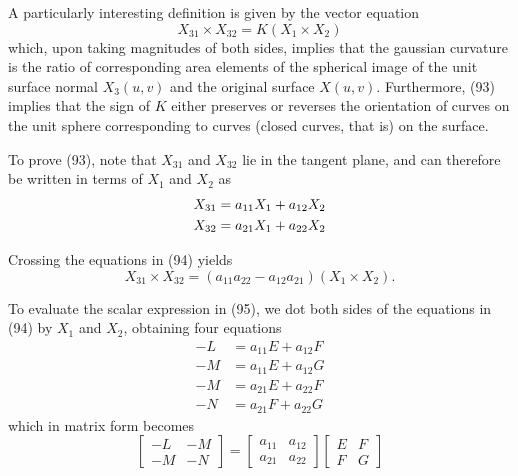 \documentclass{book}
\begin{document}
A particularly interesting definition is given by the vector equation
\begin{equation}
X_{31} \times X_{32} = K(X_{1} \times X_{2})
\end{equation}
which, upon taking magnitudes of both sides, implies that the gaussian curvature is the ratio of corresponding area elements of the spherical image of the unit surface normal $X_{3}(u,v)$ and the original surface $X(u,v)$. Furthermore, (93) implies that the sign of $K$ either preserves or reverses the orientation of curves on the unit sphere corresponding to curves (closed curves, that is) on the surface.

To prove (93), note that $X_{31}$ and $X_{32}$ lie in the tangent plane, and can therefore be written in terms of $X_{1}$ and $X_{2}$ as
\begin{align}
X_{31} & = a_{11} X_{1} + a_{12} X_{2} \\
X_{32} & = a_{21} X_{1} + a_{22} X_{2} \notag
\end{align}

Crossing the equations in (94) yields
\begin{equation}
X_{31} \times X_{32} = (a_{11} a_{22} - a_{12} a_{21}) (X_{1} \times X_{2}) .
\end{equation}

To evaluate the scalar expression in (95), we dot both sides of the equations in (94) by $X_{1}$ and $X_{2}$, obtaining four equations
\begin{align*}
- L & = a_{11}E + a_{12}F \\
- M & = a_{11}E + a_{12}G \\
- M & = a_{21}E + a_{22}F \\
- N & = a_{21}F + a_{22}G
\end{align*}
which in matrix form becomes
\begin{equation*}
  \begin{bmatrix}
    -L & -M \\
    -M & -N
  \end{bmatrix}
=
  \begin{bmatrix}
    a_{11} & a_{12} \\
    a_{21} & a_{22}
  \end{bmatrix}
  \begin{bmatrix}
    E & F \\
    F & G
  \end{bmatrix}
\end{equation*}
\end{document}

